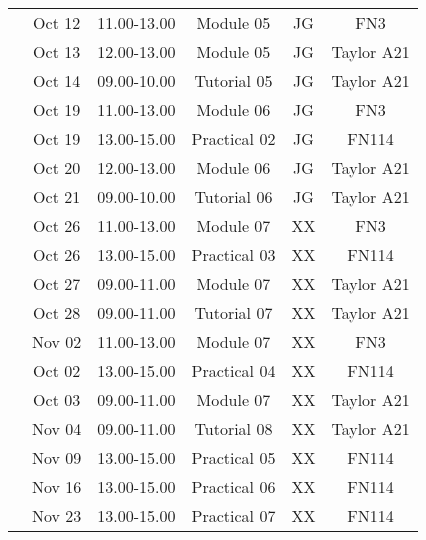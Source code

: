 \documentclass[12pts,a4paper,amsmath,amssymb,floatfix]{article}%
\begin{document}
\begin{center}
\begin{tabular}{||c||c|c|c|c|c||}
\hline
\multirow{3}{*}{\color{red}{Week 11}} & Oct 12    & 11.00-13.00 & Module 05   & JG  & FN3 \\
                                      & Oct 13    & 12.00-13.00 & Module 05   & JG  & Taylor A21 \\
                                      & Oct 14    & 09.00-10.00 & Tutorial 05 & JG  & Taylor A21 \\
\hline
\multirow{3}{*}{\color{red}{Week 12}} & Oct 19    & 11.00-13.00 & Module 06   & JG  & FN3 \\
                                      & Oct 19    & 13.00-15.00 & Practical 02 & JG & FN114 \\
                                      & Oct 20    & 12.00-13.00 & Module 06   & JG  & Taylor A21 \\
                                      & Oct 21    & 09.00-10.00 & Tutorial 06 & JG  & Taylor A21 \\
\hline
\multirow{3}{*}{\color{red}{Week 13}} & Oct 26    & 11.00-13.00 & Module 07   & XX  & FN3 \\
                                      & Oct 26    & 13.00-15.00 & Practical 03 & XX & FN114 \\
                                      & Oct 27    & 09.00-11.00 & Module 07   & XX  & Taylor A21 \\
                                      & Oct 28    & 09.00-11.00 & Tutorial 07 & XX  & Taylor A21 \\
\hline
\multirow{3}{*}{\color{red}{Week 14}} & Nov 02    & 11.00-13.00 & Module 07   & XX  & FN3 \\
                                      & Oct 02    & 13.00-15.00 & Practical 04 & XX & FN114 \\
                                      & Oct 03    & 09.00-11.00 & Module 07   & XX  & Taylor A21 \\
                                      & Nov 04    & 09.00-11.00 & Tutorial 08 & XX  & Taylor A21 \\
\hline
\multirow{3}{*}{\color{red}{Week 15}} & Nov 09    & 13.00-15.00 & Practical 05 & XX  & FN114 \\
\hline
\multirow{3}{*}{\color{red}{Week 16}} & Nov 16    & 13.00-15.00 & Practical 06 & XX  & FN114 \\
\hline
\multirow{3}{*}{\color{red}{Week 17}} & Nov 23    & 13.00-15.00 & Practical 07 & XX  & FN114  \\
\hline\hline

\end{tabular}
\end{center}
\end{document}
